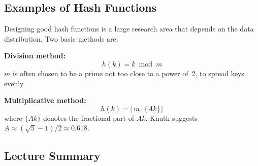 \subsection{Examples of Hash Functions}

Designing good hash functions is a large research area that depends on the data distribution.
Two basic methods are:

\textbf{Division method:}
\[
  h(k) = k \bmod m
\]
$m$ is often chosen to be a prime not too close to a power of~2, to spread keys evenly.

\textbf{Multiplicative method:}
\[
  h(k) = \lfloor m \cdot \{Ak\} \rfloor
\]
where $\{Ak\}$ denotes the fractional part of $Ak$. Knuth suggests $A \approx (\sqrt{5}-1)/2
\approx 0.618$.

\subsection{Lecture Summary}

